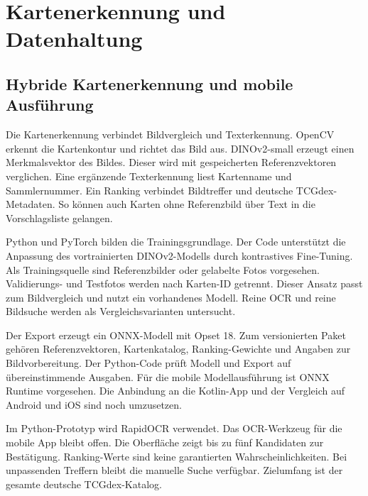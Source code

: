 \section{Kartenerkennung und Datenhaltung}

\subsection{Hybride Kartenerkennung und mobile Ausführung}
Die Kartenerkennung verbindet Bildvergleich und Texterkennung. OpenCV erkennt die Kartenkontur und richtet das Bild aus. DINOv2-small erzeugt einen Merkmalsvektor des Bildes. Dieser wird mit gespeicherten Referenzvektoren verglichen. Eine ergänzende Texterkennung liest Kartenname und Sammlernummer. Ein Ranking verbindet Bildtreffer und deutsche TCGdex-Metadaten. So können auch Karten ohne Referenzbild über Text in die Vorschlagsliste gelangen. \cite{dinov2}

Python und PyTorch bilden die Trainingsgrundlage. Der Code unterstützt die Anpassung des vortrainierten DINOv2-Modells durch kontrastives Fine-Tuning. Als Trainingsquelle sind Referenzbilder oder gelabelte Fotos vorgesehen. Validierungs- und Testfotos werden nach Karten-ID getrennt. Dieser Ansatz passt zum Bildvergleich und nutzt ein vorhandenes Modell. Reine OCR und reine Bildsuche werden als Vergleichsvarianten untersucht.

Der Export erzeugt ein ONNX-Modell mit Opset 18. Zum versionierten Paket gehören Referenzvektoren, Kartenkatalog, Ranking-Gewichte und Angaben zur Bildvorbereitung. Der Python-Code prüft Modell und Export auf übereinstimmende Ausgaben. Für die mobile Modellausführung ist ONNX Runtime vorgesehen. Die Anbindung an die Kotlin-App und der Vergleich auf Android und iOS sind noch umzusetzen. \cite{onnxmobile}

Im Python-Prototyp wird RapidOCR verwendet. Das OCR-Werkzeug für die mobile App bleibt offen. Die Oberfläche zeigt bis zu fünf Kandidaten zur Bestätigung. Ranking-Werte sind keine garantierten Wahrscheinlichkeiten. Bei unpassenden Treffern bleibt die manuelle Suche verfügbar. Zielumfang ist der gesamte deutsche TCGdex-Katalog.

